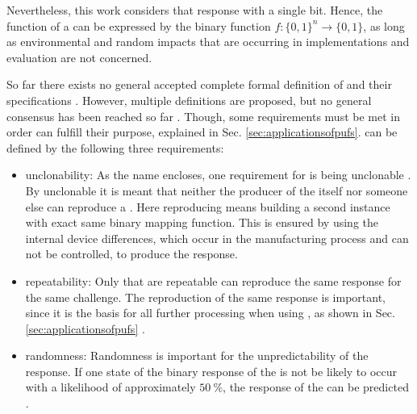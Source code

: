 Nevertheless, this work considers \pufs that response with a single bit.
Hence, the function of a \puf can be expressed by the binary function $f: \{0, 1\}^n \to \{0,1\}$, as long as environmental and random impacts that are occurring in \puf implementations and evaluation are not concerned. %

So far there exists no general accepted complete formal definition of \pufs and their specifications \cite{Becker2015ThePUFs}.
However, multiple definitions are proposed, but no general consensus has been reached so far \cite{Armknecht2011AFunctions,Ruhrmair2014PUFsGlance,Tehranipoor2012IntroductionTrust}.
Though, some requirements must be met in order \pufs can fulfill their purpose, explained in Sec. \ref{sec:applicationsofpufs}.
\pufs can be defined by the following three requirements:


\begin{itemize}
\item unclonability: As the name \puf encloses, one requirement for \pufs is being unclonable \cite{Tajik2014PhysicalPUFs}.
By unclonable it is meant that neither the producer of the \puf itself nor someone else can reproduce a \puf.
Here reproducing means building a second instance with exact same binary mapping function.
This is ensured by using the internal device differences, which occur in the manufacturing process and can not be controlled, to produce the \puf response.
\item repeatability: Only \pufs that are repeatable can reproduce the same response for the same challenge.
The reproduction of the same response is important, since it is the basis for all further processing when using \pufs, as shown in Sec. \ref{sec:applicationsofpufs} \cite{Armknecht2011AFunctions}.
\item randomness: Randomness is important for the unpredictability of the \puf response.
If one state of the binary response of the \puf is not be likely to occur with a likelihood of approximately $50\ \%$, the response of the \puf can be predicted \cite{CherifJouini2011PerformanceStatistics}.
\end{itemize}

